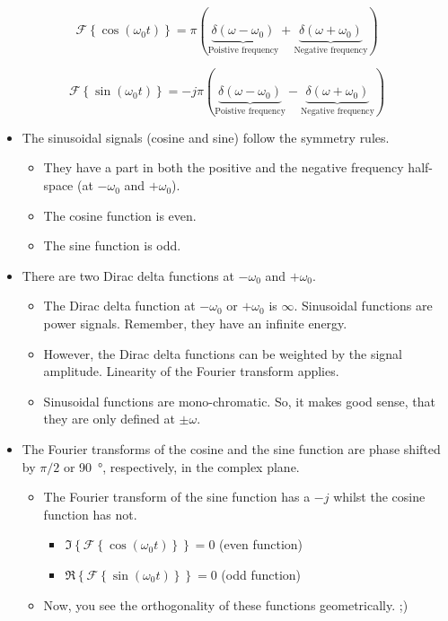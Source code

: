 \begin{refsection}
\begin{equation}
	\mathcal{F} \left\{\cos\left(\omega_0 t\right)\right\} = \pi \left( \underbrace{\delta\left(\omega - \omega_0\right)}_{\text{Poistive frequency}} + \underbrace{\delta\left(\omega + \omega_0\right)}_{\text{Negative frequency}} \right)
\end{equation}

\begin{equation}
	\mathcal{F} \left\{\sin\left(\omega_0 t\right)\right\} = -j \pi \left( \underbrace{\delta\left(\omega - \omega_0\right)}_{\text{Poistive frequency}} - \underbrace{\delta\left(\omega + \omega_0\right)}_{\text{Negative frequency}} \right)
\end{equation}

\begin{itemize}
	\item The sinusoidal signals (cosine and sine) follow the symmetry rules.
	\begin{itemize}
		\item They have a part in both the positive and the negative frequency half-space (at $- \omega_0$ and $+ \omega_0$).
		\item The cosine function is even.
		\item The sine function is odd.
	\end{itemize}
	\item There are two Dirac delta functions at $- \omega_0$ and $+ \omega_0$.
	\begin{itemize}
		\item The Dirac delta function at $- \omega_0$ or $+ \omega_0$ is $\infty$. Sinusoidal functions are power signals. Remember, they have an infinite energy.
		\item However, the Dirac delta functions can be weighted by the signal amplitude. Linearity of the Fourier transform applies.
		\item Sinusoidal functions are mono-chromatic. So, it makes good sense, that they are only defined at $\pm \omega$.
	\end{itemize}
	\item The Fourier transforms of the cosine and the sine function are phase shifted by $\pi/2$ or \SI{90}{\degree}, respectively, in the complex plane.
	\begin{itemize}
		\item The Fourier transform of the sine function has a $-j$ whilst the cosine function has not.
		\begin{itemize}
			\item $\Im\left\{\mathcal{F} \left\{\cos\left(\omega_0 t\right)\right\}\right\} = 0$ (even function)
			\item $\Re\left\{\mathcal{F} \left\{\sin\left(\omega_0 t\right)\right\}\right\} = 0$ (odd function)
		\end{itemize}
		\item Now, you see the orthogonality of these functions geometrically. ;)
	\end{itemize}
\end{itemize}



\end{refsection}

